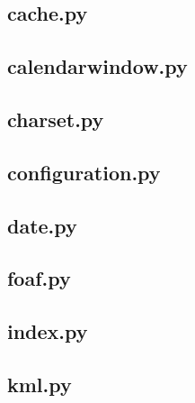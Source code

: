 \subsection*{cache.py}



\subsection*{calendarwindow.py}



\subsection*{charset.py}



\subsection*{configuration.py}



\subsection*{date.py}



\subsection*{foaf.py}



\subsection*{index.py}



\subsection*{kml.py}




